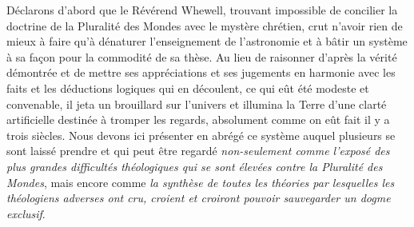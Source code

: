 \documentclass[a4paper, 11pt, oneside]{article}
\begin{document}
Déclarons d'abord que le Révérend Whewell, trouvant impossible de concilier la doctrine de la Pluralité des Mondes avec le mystère chrétien, crut n'avoir rien de mieux à faire qu'à dénaturer l'enseignement de l'astronomie et à bâtir un système à sa façon pour la commodité de sa thèse. Au lieu de raisonner d'après la vérité démontrée et de mettre ses appréciations et ses jugements en harmonie avec les faits et les déductions logiques qui en découlent, ce qui eût été modeste et convenable, il jeta un brouillard sur l'univers et illumina la Terre d'une clarté artificielle destinée à tromper les regards, absolument comme on eût fait il y a trois siècles. Nous devons ici présenter en abrégé ce système auquel plusieurs se sont laissé prendre et qui peut être regardé \emph{non-seulement comme l'exposé des plus grandes difficultés théologiques qui se sont élevées contre la Pluralité des Mondes}, mais encore comme \emph{la synthèse de toutes les théories par lesquelles les théologiens adverses ont cru, croient et croiront pouvoir sauvegarder un dogme exclusif}.
\end{document}
